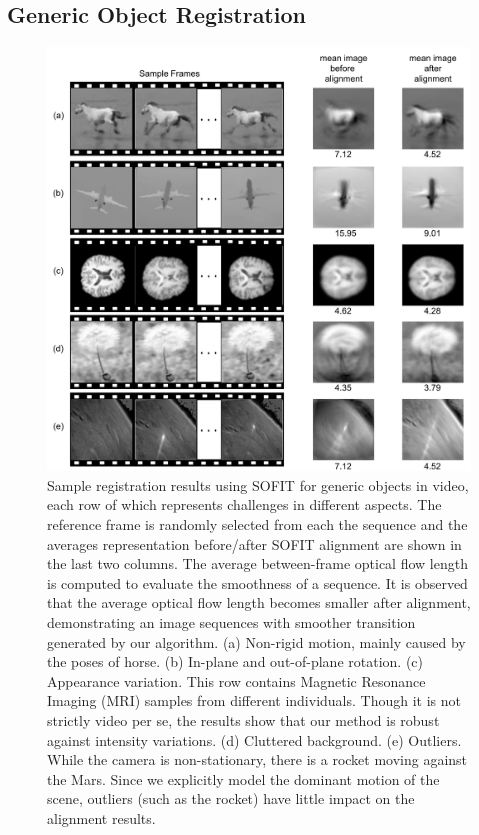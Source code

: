 \documentclass[10pt,journal]{IEEEtran}
\begin{document}
\subsection{Generic Object Registration}


\begin{figure}[htbp]
	\centering
		\includegraphics[width=.65\textwidth]{fig/object_ex.png}
	\caption{Sample registration results using SOFIT for generic objects in video, each row of which represents challenges in different aspects. The reference frame is randomly selected from each the sequence and the averages representation before/after SOFIT alignment are shown in the last two columns. The average between-frame optical flow length is computed to evaluate the smoothness of a sequence. It is observed that the average optical flow length becomes smaller after alignment, demonstrating an image sequences with smoother transition generated by our algorithm. (a) Non-rigid motion, mainly caused by the poses of horse. (b) In-plane and out-of-plane rotation. (c) Appearance variation. This row contains Magnetic Resonance Imaging (MRI) samples from different individuals. Though it is not strictly video per se, the results show that our method is robust against intensity variations. (d) Cluttered background. (e) Outliers. While the camera is non-stationary, there is a rocket moving against the Mars. Since we explicitly model the dominant motion of the scene, outliers (such as the rocket) have little impact on the alignment results.}
	\label{fig:object_ex}
\end{figure}
\end{document}
